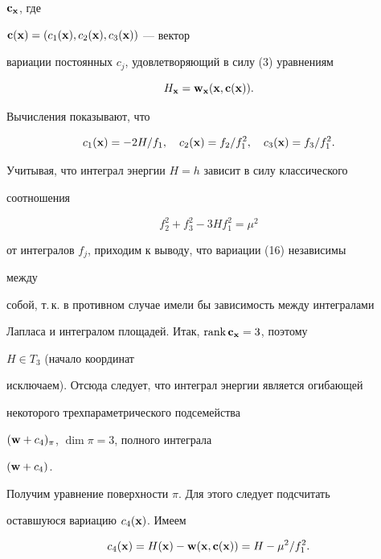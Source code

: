 $\bold c_{\bold x}$, где


$\bold c(\bold x)=(c_1(\bold x),c_2(\bold x),c_3(\bold x))$ --- вектор


вариации постоянных $c_j$, удовлетворяющий в силу (3) уравнениям


$$


H_{\bold x}=\bold w_{\bold x}(\bold x,\bold c(\bold x)).


$$





Вычисления показывают, что


\begin{equation}


c_1(\bold x)=-2H/f_1,\quad c_2(\bold x)=f_2/f^2_1,\quad


c_3(\bold x)=f_3/f^2_1.


\end{equation}


Учитывая, что интеграл энергии $H=h$ зависит в силу классического


соотношения


\begin{equation}


f^2_2+f^2_3-3H f^2_1=\mu^2


\end{equation}


от интегралов $f_j$, приходим к выводу, что вариации (16) независимы


между


собой, т.\,к. в противном случае имели бы зависимость между интегралами


Лапласа и интегралом площадей. Итак, $\operatorname{rank}\bold c_{\bold x}=3$, поэтому


$H\in T_3$ (начало координат


исключаем). Отсюда следует, что интеграл энергии является огибающей


некоторого трехпараметрического подсемейства


$(\bold w+c_4)_\pi$, $\dim\pi=3$, полного интеграла


$(\bold w+c_4)$.





Получим уравнение поверхности $\pi$. Для этого следует подсчитать


оставшуюся вариацию $c_4(\bold x)$. Имеем


\begin{equation}


c_4(\bold x)=H(\bold x)-\bold w(\bold x,\bold c(\bold x))=


H-\mu^2/f^2_1.


\end{equation}


